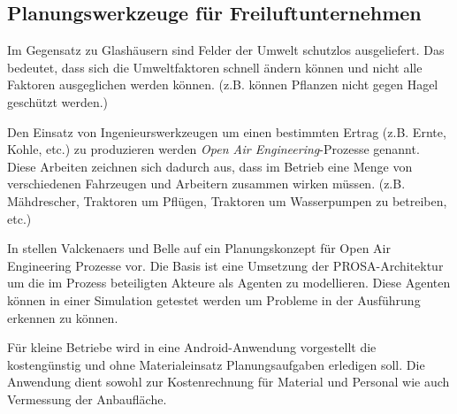 \subsection{Planungswerkzeuge für Freiluftunternehmen}
Im Gegensatz zu Glashäusern sind Felder der Umwelt schutzlos ausgeliefert. Das bedeutet, dass sich die Umweltfaktoren schnell ändern können und nicht alle Faktoren ausgeglichen werden können. (z.B. können Pflanzen nicht gegen Hagel geschützt werden.)

Den Einsatz von Ingenieurswerkzeugen um einen bestimmten Ertrag (z.B. Ernte, Kohle, etc.) zu produzieren werden \textit{Open Air Engineering}-Prozesse genannt. Diese Arbeiten zeichnen sich dadurch aus, dass im Betrieb eine Menge von verschiedenen Fahrzeugen und Arbeitern zusammen wirken müssen. (z.B. Mähdrescher, Traktoren um Pflügen, Traktoren um Wasserpumpen zu betreiben, etc.)

In \cite{conf:Valckenaers2011} stellen Valckenaers und Belle auf ein Planungskonzept für Open Air Engineering Prozesse vor. Die Basis ist eine Umsetzung der PROSA-Architektur um die im Prozess beteiligten Akteure als Agenten zu modellieren. Diese Agenten können in einer Simulation getestet werden um Probleme in der Ausführung erkennen zu können.

Für kleine Betriebe wird in \cite{conf:Lantzos2013} eine Android-Anwendung vorgestellt die kostengünstig und ohne Materialeinsatz Planungsaufgaben erledigen soll. Die Anwendung dient sowohl zur Kostenrechnung für Material und Personal wie auch Vermessung der Anbaufläche.